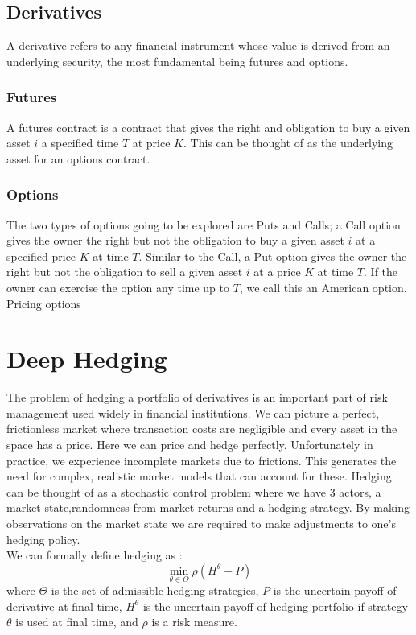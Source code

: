 \documentclass{article}
\numberwithin{equation}{section}
\begin{document}
\begin{Abstract}
\subsection{Derivatives}
A derivative refers to any financial instrument whose value is derived from an 
underlying security, the most fundamental being futures and options.
\subsubsection{Futures}
A futures contract is a contract that gives the right and obligation to buy a 
given asset $i$ a specified time $T$ at price $K$. This can be thought of as the 
underlying asset for an options contract. 
\subsubsection{Options}
The two types of options going to be explored are Puts and Calls; a Call option 
gives the owner the right but not the obligation to buy a given asset $i$ at 
a specified price $K$ at time $T$. Similar to the Call, a Put option gives the 
owner the right but not the obligation to sell a given asset $i$ at a price $K$ 
at time $T$. If the owner can exercise the option any time up to $T$, we call 
this an American option.
\\
Pricing options


\clearpage
\section{Deep Hedging}
The problem of hedging a portfolio of derivatives is an important part of 
risk management used widely in financial institutions. We can picture a perfect, 
frictionless market where transaction costs are negligible and every asset in 
the space has a price. Here we can price and hedge perfectly. Unfortunately in 
practice, we experience incomplete markets due to frictions. This generates the
need for complex, realistic market models that can account for these. Hedging can
be thought of as a stochastic control problem where we have 3 actors, a market 
state,randomness from market returns and a hedging strategy. By making 
observations on the market state we are required to make adjustments to one's
hedging policy. 
\\
We can formally define hedging as :
$$\min_{\theta \in \Theta} \rho (H^\theta - P)$$
where $\Theta$ is the set of admissible hedging strategies, $P$ is the uncertain 
payoff of derivative at final time, $H^\theta$ is the uncertain payoff of hedging 
portfolio if strategy $\theta$ is used at final time, and $\rho$ is a risk measure.







\end{Abstract}
\end{document}
